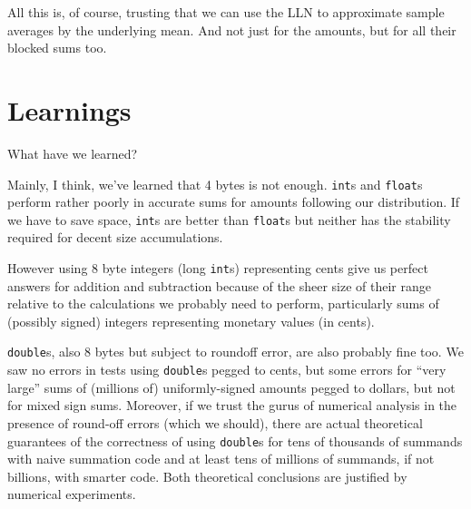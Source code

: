 \documentclass[11pt, oneside]{amsart}   	%
\begin{document}
All this is, of course, trusting that we can use the LLN to approximate sample averages by the underlying mean. And not just for the amounts, but for all their blocked sums too. 

\section{Learnings}

What have we learned? 

Mainly, I think, we've learned that 4 bytes is not enough. \texttt{int}s and \texttt{float}s perform rather poorly in accurate sums for amounts following our distribution. If we have to save space, \texttt{int}s are better than \texttt{float}s but neither has the stability required for decent size accumulations. 

However using 8 byte integers (long \texttt{int}s) representing cents give us perfect answers for addition and subtraction because of the sheer size of their range relative to the calculations we probably need to perform, particularly sums of (possibly signed) integers representing monetary values (in cents). 

\texttt{double}s, also 8 bytes but subject to roundoff error, are also probably fine too. We saw no errors in tests using \texttt{double}s pegged to cents, but some errors for ``very large'' sums of (millions of) uniformly-signed amounts pegged to dollars, but not for mixed sign sums. Moreover, if we trust the gurus of numerical analysis in the presence of round-off errors (which we should), there are actual theoretical guarantees of the correctness of using \texttt{double}s for tens of thousands of summands with naive summation code and at least tens of millions of summands, if not billions, with smarter code. Both theoretical conclusions are justified by numerical experiments. 
\end{document}
